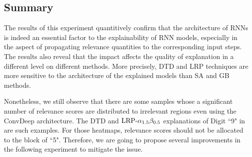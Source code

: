 
\subsection{Summary}
The results of this experiment quantitively confirm that the architecture of RNNs is indeed an essential factor to the explainability of RNN models, especially in the aspect of propagating relevance quantities to the corresponding input steps.  The results also reveal that the impact affects the quality of explanation in a different level on different  methods. More precisely, DTD and LRP techniques are more sensitive to the architecture of the explained models than SA and GB methods.

Nonetheless, we  still observe that there are some samples whose a significant number of relevance scores are distributed to irrelevant regions even using the ConvDeep architecture. The DTD and $\text{LRP-}\alpha_{1.5}\beta_{0.5}$ explanations of Digit ``9" in \addfigure{\ref{fig:heatmap_msc_mix_for_thesis}} are such examples. For those heatmaps, relevance scores should not be allocated to the block of ``5".   Therefore,  we are going to propose several improvements in the following experiment to mitigate the issue.

